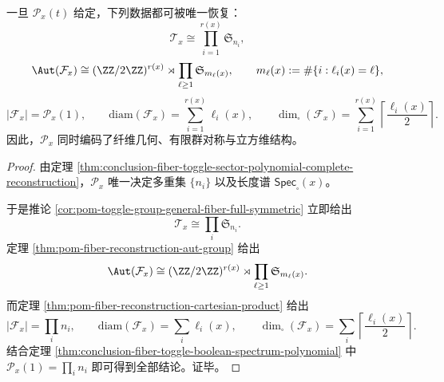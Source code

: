 \begin{corollary}[扇区维数多项式对几何与对称的全恢复性]\label{cor:conclusion-fiber-toggle-sector-polynomial-recovers-geometry-symmetry}
一旦 \(\mathscr P_x(t)\) 给定，下列数据都可被唯一恢复：
\[
\mathcal T_x\cong \prod_{i=1}^{r(x)}\mathfrak S_{n_i},
\]
\[
\Aut(\mathcal F_x)\cong (\ZZ/2\ZZ)^{r(x)}\rtimes \prod_{\ell\ge 1}\mathfrak S_{m_\ell(x)},
\qquad
m_\ell(x):=\#\{i:\ell_i(x)=\ell\},
\]
\[
|\mathcal F_x|=\mathscr P_x(1),
\qquad
\mathrm{diam}(\mathcal F_x)=\sum_{i=1}^{r(x)}\ell_i(x),
\qquad
\dim_{\square}(\mathcal F_x)=\sum_{i=1}^{r(x)}\left\lceil\frac{\ell_i(x)}{2}\right\rceil.
\]
因此，\(\mathscr P_x\) 同时编码了纤维几何、有限群对称与立方维结构。
\end{corollary}
\begin{proof}
由定理 \ref{thm:conclusion-fiber-toggle-sector-polynomial-complete-reconstruction}，\(\mathscr P_x\) 唯一决定多重集 \(\{n_i\}\) 以及长度谱 \(\mathsf{Spec}_{\square}(x)\)。

于是推论 \ref{cor:pom-toggle-group-general-fiber-full-symmetric} 立即给出
\[
\mathcal T_x\cong \prod_i \mathfrak S_{n_i}.
\]
定理 \ref{thm:pom-fiber-reconstruction-aut-group} 给出
\[
\Aut(\mathcal F_x)\cong (\ZZ/2\ZZ)^{r(x)}\rtimes \prod_{\ell\ge 1}\mathfrak S_{m_\ell(x)}.
\]
而定理 \ref{thm:pom-fiber-reconstruction-cartesian-product} 给出
\[
|\mathcal F_x|=\prod_i n_i,
\qquad
\mathrm{diam}(\mathcal F_x)=\sum_i\ell_i(x),
\qquad
\dim_{\square}(\mathcal F_x)=\sum_i\left\lceil\frac{\ell_i(x)}{2}\right\rceil.
\]
结合定理 \ref{thm:conclusion-fiber-toggle-boolean-spectrum-polynomial} 中
\(
\mathscr P_x(1)=\prod_i n_i
\)
即可得到全部结论。证毕。
\end{proof}

